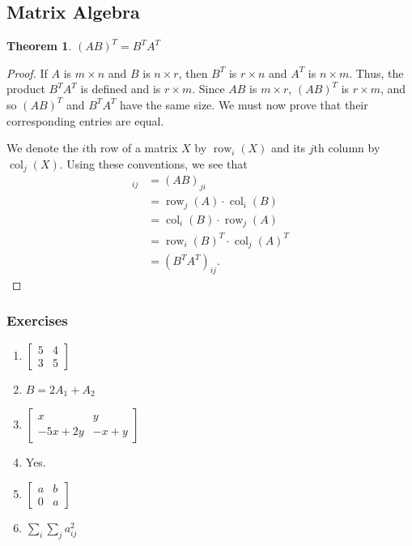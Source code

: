 \documentclass{article}
\newtheorem*{theorem*}{Theorem}
\begin{document}
\subsection{Matrix Algebra}
\begin{theorem*}
	$(AB)^T=B^TA^T$
\end{theorem*}
\begin{proof}
	If $A$ is $m\times n$ and $B$ is $n\times r$, then $B^T$ is $r\times n$ and $A^T$ is $n\times m$.
	Thus, the product $B^TA^T$ is defined and is $r\times m$. Since $AB$ is $m\times r$, $(AB)^T$ is
	$r\times m$, and so $(AB)^T$ and $B^TA^T$ have the same size. We must now prove that their
	corresponding entries are equal.

	We denote the $i$th row of a matrix $X$ by $\operatorname{row}_i(X)$ and its $j$th column by $
		\operatorname{col}_j(X)$. Using these conventions, we see that
	\begin{align*}
		[(AB)^T]_{ij} & = (AB)_{ji}                                               \\
		              & = \operatorname{row}_j(A)\cdot\operatorname{col}_i(B)     \\
		              & = \operatorname{col}_i(B)\cdot\operatorname{row}_j(A)     \\
		              & = \operatorname{row}_i(B)^T\cdot\operatorname{col}_j(A)^T \\
		              & = (B^TA^T)_{ij}.
	\end{align*}
\end{proof}
\subsubsection*{Exercises}
\begin{enumerate}
	\item $
		      \begin{bmatrix}
			      5 & 4 \\
			      3 & 5
		      \end{bmatrix}
	      $
	      \setcounter{enumi}{4}
	\item $B=2A_1+A_2$
	      \setcounter{enumi}{8}
	\item $
		      \begin{bmatrix}
			      x      & y    \\
			      -5x+2y & -x+y
		      \end{bmatrix}
	      $
	      \setcounter{enumi}{12}
	\item Yes.
	      \setcounter{enumi}{22}
	\item $
		      \begin{bmatrix}
			      a & b \\
			      0 & a
		      \end{bmatrix}
	      $
	      \setcounter{enumi}{45}
	\item $\sum_{i}\sum_{j}a_{ij}^2$
\end{enumerate}
\end{document}

